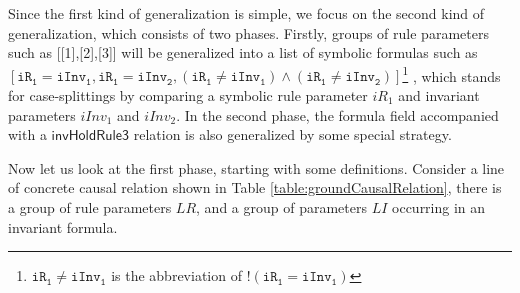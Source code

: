 \documentclass[final]{IEEEtran}
\def \eqc {=}
\def \iInv {iInv}
\def \iR {iR}
\begin{document}
Since the first kind of generalization is simple, we focus on the second kind of generalization, which consists of two phases.
Firstly, groups of rule parameters  such as [[1],[2],[3]] will be generalized into a list of  symbolic formulas  such as $[\mathtt{\iR_1} \eqc \mathtt{\iInv_1},\mathtt{\iR_1} \eqc \mathtt{\iInv_2},  (\mathtt{\iR_1} \ne \mathtt{\iInv_1}) \wedge  (\mathtt{\iR_1} \ne \mathtt{\iInv_2})] $\footnote{$\mathtt{\iR_1} \ne \mathtt{\iInv_1}$ is the abbreviation of $!(\mathtt{\iR_1} \eqc \mathtt{\iInv_1})$} , which  stands for case-splittings  by comparing  a symbolic rule parameter $iR_1$ and invariant parameters $\iInv_1$ and $\iInv_2$. In the second phase, the formula field accompanied with a $\mathsf{invHoldRule3}$ relation is also  generalized by some special strategy.  %

Now let us look at the first phase, starting with some definitions.
Consider a line of concrete causal relation shown in Table \ref{table:groundCausalRelation}, there is a group of rule parameters $LR$, and a group of parameters $LI$ occurring in an  invariant formula.
\end{document}
